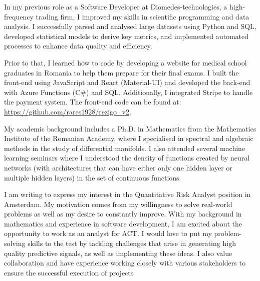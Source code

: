 \documentclass[11pt, a4paper]{awesome-cv}
\begin{document}
\makecvheader[R]

\makecvfooter
  {}
  {}
  {}

\makelettertitle

\begin{cvletter}

In my previous role as a Software Developer at Diomedes-technologies, a high-frequency trading firm, I improved my skills in scientific programming and data analysis. I successfully parsed and analysed large datasets using Python and SQL, developed statistical models to derive key metrics, and implemented automated processes to enhance data quality and efficiency. 

Prior to that, I learned how to code by developing a website for medical school graduates in Romania to help them prepare for their final exams. I built the front-end using JavaScript and React (Material-UI) and developed the back-end with Azure Functions (C\#) and SQL. Additionally, I integrated Stripe to handle the payment system. The front-end code can be found at: \url{https://github.com/rares1928/rezigo_v2}.

My academic background includes a Ph.D. in Mathematics from the Mathematics Institute of the Romanian Academy, where I specialised in spectral and algebraic methods in the study of differential manifolds. I also attended several machine learning seminars where I understood the density of functions created by neural networks (with architectures that can have either only one hidden layer or multiple hidden layers) in the set of continuous functions.


I am writing to express my interest in the Quantitative Risk Analyst position in Amsterdam. My motivation comes from my willingness to solve real-world problems as well as my desire to constantly improve. With my background in mathematics and experience in software development, I am excited about the opportunity to work as an analyst for ACT. I would love to put my problem-solving skills to the test by tackling challenges that arise in generating high quality predictive signals, as well as implementing these ideas. I also value collaboration and have experience working closely with various stakeholders to ensure the successful execution of projects


\end{cvletter}
\end{document}

